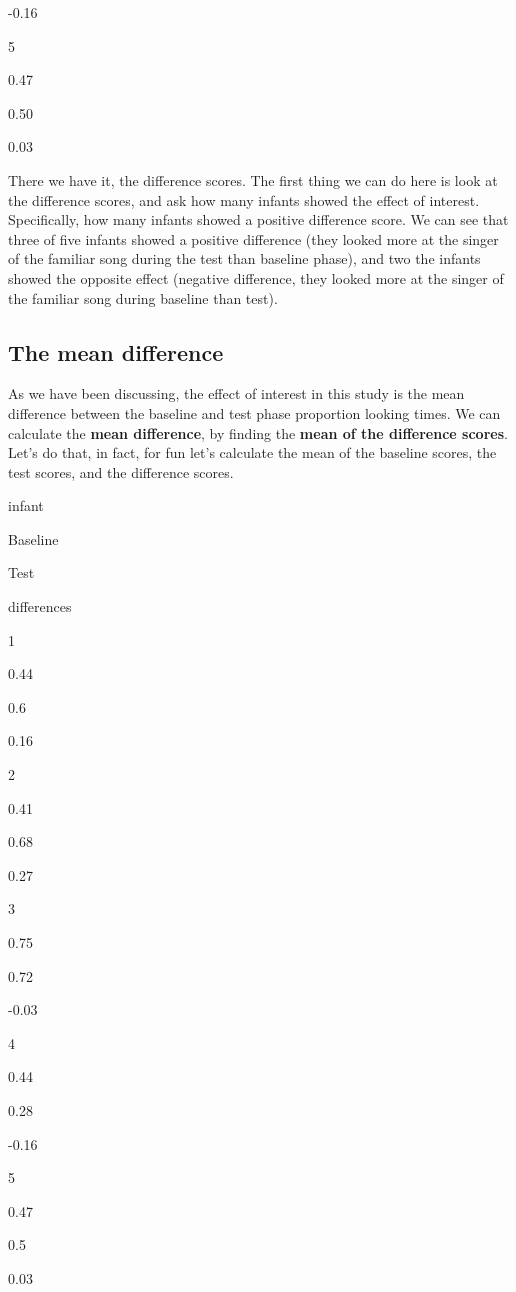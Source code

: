 \documentclass[]{book}
\begin{document}
-0.16

5

0.47

0.50

0.03

There we have it, the difference scores. The first thing we can do here is look at the difference scores, and ask how many infants showed the effect of interest. Specifically, how many infants showed a positive difference score. We can see that three of five infants showed a positive difference (they looked more at the singer of the familiar song during the test than baseline phase), and two the infants showed the opposite effect (negative difference, they looked more at the singer of the familiar song during baseline than test).

\hypertarget{the-mean-difference}{%
\subsection{The mean difference}\label{the-mean-difference}}

As we have been discussing, the effect of interest in this study is the mean difference between the baseline and test phase proportion looking times. We can calculate the \textbf{mean difference}, by finding the \textbf{mean of the difference scores}. Let's do that, in fact, for fun let's calculate the mean of the baseline scores, the test scores, and the difference scores.

infant

Baseline

Test

differences

1

0.44

0.6

0.16

2

0.41

0.68

0.27

3

0.75

0.72

-0.03

4

0.44

0.28

-0.16

5

0.47

0.5

0.03
\end{document}
